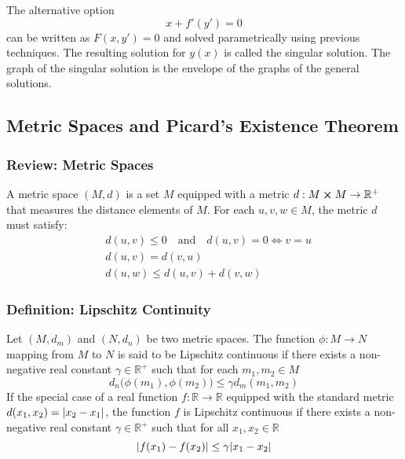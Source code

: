 \documentclass[11pt, a4paper]{article}
\newcommand{\R}{\mathbb{R}} %
\begin{document}
The alternative option 
\begin{equation*}
	x + f'(y') = 0
\end{equation*}
can be written as $ F(x, y') = 0 $ and solved parametrically using previous techniques. The resulting solution for $ y(x) $ is called the singular solution. The graph of the singular solution is the envelope of the graphs of the general solutions.

\subsection{Metric Spaces and Picard's Existence Theorem}

\subsubsection{Review: Metric Spaces}
A metric space $ (M, d) $ is a set $ M $ equipped with a metric $ d : M \cross M \to \R^+ $ that measures the distance elements of $ M $. For each $ u, v, w \in M $, the metric $ d $ must satisfy:
\begin{align*}
	&d(u, v) \leq 0 \quad \text{and} \quad d(u, v) = 0 \iff v = u \\
	&d(u, v) = d(v, u)\\
	&d(u, w) \leq d(u, v) + d(v, w)
\end{align*}

\subsubsection{Definition: Lipschitz Continuity}
Let $ (M, d_m) $ and $ (N, d_n) $ be two metric spaces. The function $ \phi: M \to N $ mapping from $ M $ to $ N $ is said to be Lipschitz continuous if there exists a non-negative real constant $ \gamma \in \R^+ $  such that for each $ m_1, m_2 \in M$
\begin{equation*}
	d_n \big (\phi(m_1), \phi(m_2) \big) \leq \gamma d_m(m_1, m_2)
\end{equation*}
If the special case of a real function $ f: \R \to \R $ equipped with the standard metric $ d(x_1, x_2) = \abs{x_2 - x_1} $, the function $ f $ is Lipschitz continuous if there exists a non-negative real constant $ \gamma \in \R^+ $ such that for all $ x_1, x_2 \in \R $ 
\begin{equation*}
	\abs{f(x_1) - f(x_2)}  \leq \gamma \abs{x_1 - x_2}
\end{equation*}
\end{document}
